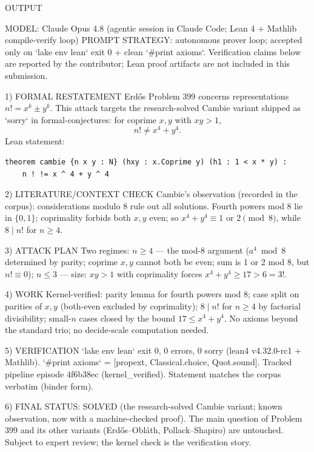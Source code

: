 
OUTPUT

MODEL: Claude Opus 4.8 (agentic session in Claude Code; Lean 4 + Mathlib compile-verify loop)
PROMPT STRATEGY: autonomous prover loop; accepted only on `lake env lean` exit 0 + clean
`#print axioms`. Verification claims below are reported by the contributor;
Lean proof artifacts are not included in this submission.

1) FORMAL RESTATEMENT
Erdős Problem 399 concerns representations $n! = x^k \pm y^k$. This attack targets the
research-solved Cambie variant shipped as `sorry` in formal-conjectures: for coprime
$x, y$ with $xy > 1$,
\[
n! \ne x^4 + y^4 .
\]
Lean statement:
\begin{verbatim}
theorem cambie {n x y : N} (hxy : x.Coprime y) (h1 : 1 < x * y) :
    n ! != x ^ 4 + y ^ 4
\end{verbatim}

2) LITERATURE/CONTEXT CHECK
Cambie's observation (recorded in the corpus): considerations modulo 8 rule out all
solutions. Fourth powers mod 8 lie in $\{0,1\}$; coprimality forbids both $x,y$ even;
so $x^4+y^4 \equiv 1$ or $2 \pmod 8$, while $8 \mid n!$ for $n \ge 4$.

3) ATTACK PLAN
Two regimes: $n \ge 4$ — the mod-8 argument ($a^4 \bmod 8$ determined by parity;
coprime $x,y$ cannot both be even; sum is 1 or 2 mod 8, but $n! \equiv 0$);
$n \le 3$ — size: $xy > 1$ with coprimality forces $x^4 + y^4 \ge 17 > 6 = 3!$.

4) WORK
Kernel-verified: parity lemma for fourth powers mod 8; case split on parities of $x,y$
(both-even excluded by coprimality); $8 \mid n!$ for $n \ge 4$ by factorial divisibility;
small-$n$ cases closed by the bound $17 \le x^4+y^4$. No axioms beyond the standard trio;
no decide-scale computation needed.

5) VERIFICATION
`lake env lean` exit 0, 0 errors, 0 sorry (lean4 v4.32.0-rc1 + Mathlib).
`#print axioms` = [propext, Classical.choice, Quot.sound].
Tracked pipeline episode 4f6b38ec (kernel_verified). Statement matches the corpus
verbatim (binder form).

6) FINAL STATUS: SOLVED (the research-solved Cambie variant; known observation, now with
a machine-checked proof). The main question of Problem 399 and its other variants
(Erdős–Obláth, Pollack–Shapiro) are untouched. Subject to expert review; the kernel
check is the verification story.
